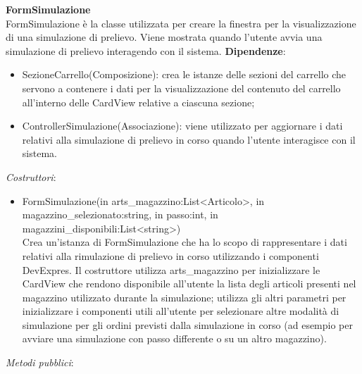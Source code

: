 \textbf{FormSimulazione}\\
FormSimulazione è la classe utilizzata per creare la finestra per la visualizzazione di una simulazione di prelievo.
Viene mostrata quando l'utente avvia una simulazione di prelievo interagendo con il sistema.
\textbf{Dipendenze}:
\begin{itemize}
    \item SezioneCarrello(Composizione): crea le istanze delle sezioni del carrello che servono a contenere i dati per la visualizzazione del contenuto del carrello all'interno delle CardView relative a
    ciascuna sezione;\\
    \item ControllerSimulazione(Associazione): viene utilizzato per aggiornare i dati relativi alla simulazione di prelievo in corso quando l'utente interagisce con il sistema.
\end{itemize}
\textit{Costruttori}:\\
\begin{itemize}
    \item FormSimulazione(in arts\_magazzino:List<Articolo>, in magazzino\_selezionato:string, in passo:int, in magazzini\_disponibili:List<string>)\\
    Crea un'istanza di FormSimulazione che ha lo scopo di rappresentare i dati relativi alla rimulazione di prelievo in corso utilizzando i componenti DevExpres.
    Il costruttore utilizza arts\_magazzino per inizializzare le CardView che rendono disponibile all'utente la lista degli articoli presenti nel magazzino utilizzato durante la simulazione;
    utilizza gli altri parametri per inizializzare i componenti utili all'utente per selezionare altre modalità di simulazione per gli ordini previsti dalla simulazione in corso (ad esempio per avviare 
    una simulazione con passo differente o su un altro magazzino).
\end{itemize}
\textit{Metodi pubblici}:\\
